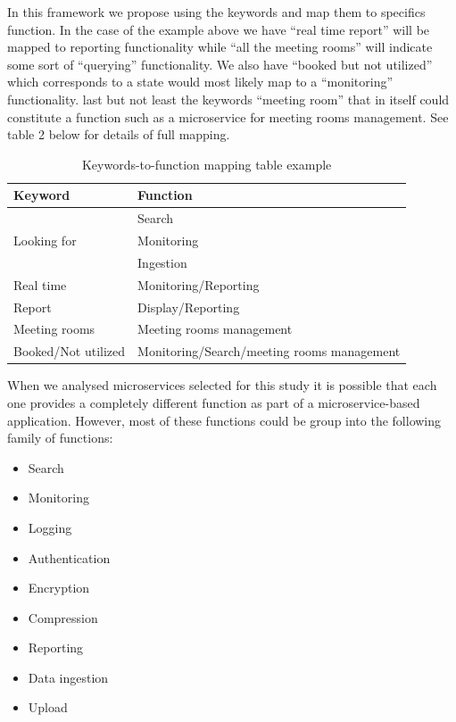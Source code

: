 \documentclass{article}
\begin{document}
In this framework we propose using the keywords and map them to specifics function. In the case of the example above we have “real time report” will be mapped to reporting functionality while “all the meeting rooms” will indicate some sort of “querying” functionality. We also have “booked but not utilized” which corresponds to a state would most likely map to a “monitoring” functionality. last but not least the keywords “meeting room” that in itself could constitute a function such as a microservice for meeting rooms management. See table 2 below for details of full mapping.


\begin{table}[h!]
  \begin{center}
  \small
    \begin{tabular}{|l|l|} %
    \hline
    \textbf{Keyword} & \textbf{Function}\\
    \hline
      \multirow{3}{*}{Looking for} & Search\\
      & Monitoring\\ 
      & Ingestion\\
      \hline
      Real time & Monitoring/Reporting\\
      \hline
      Report & Display/Reporting\\
      \hline
      Meeting rooms & Meeting rooms management\\
      \hline
      Booked/Not utilized & Monitoring/Search/meeting rooms management\\
      \hline
    \end{tabular}
        \caption{Keywords-to-function mapping table example}
    \label{tab:Table 2}
  \end{center}
\end{table}


When we analysed microservices selected for this study it is possible that each one provides a completely different function as part of a microservice-based application. However, most of these functions could be group into the following family of functions:

\begin{itemize}


\item Search
\item Monitoring
\item Logging
\item Authentication
\item Encryption
\item Compression
\item Reporting
\item Data ingestion
\item Upload
\end{itemize}
\end{document}
